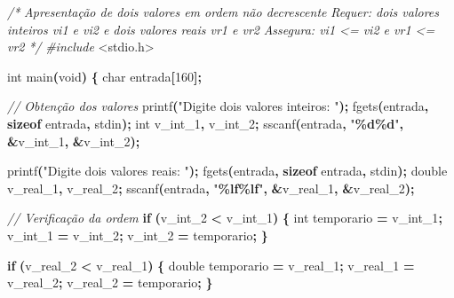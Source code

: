 \documentclass[
  11pt,
  a4paper,
]{scrbook}
\newenvironment{Shaded}{\begin{snugshade}}{\end{snugshade}}
\newcommand{\CommentTok}[1]{\textcolor[rgb]{0.56,0.35,0.01}{\textit{#1}}}
\newcommand{\ControlFlowTok}[1]{\textcolor[rgb]{0.13,0.29,0.53}{\textbf{#1}}}
\newcommand{\DataTypeTok}[1]{\textcolor[rgb]{0.13,0.29,0.53}{#1}}
\newcommand{\DecValTok}[1]{\textcolor[rgb]{0.00,0.00,0.81}{#1}}
\newcommand{\ImportTok}[1]{#1}
\newcommand{\KeywordTok}[1]{\textcolor[rgb]{0.13,0.29,0.53}{\textbf{#1}}}
\newcommand{\NormalTok}[1]{#1}
\newcommand{\OperatorTok}[1]{\textcolor[rgb]{0.81,0.36,0.00}{\textbf{#1}}}
\newcommand{\PreprocessorTok}[1]{\textcolor[rgb]{0.56,0.35,0.01}{\textit{#1}}}
\newcommand{\SpecialCharTok}[1]{\textcolor[rgb]{0.81,0.36,0.00}{\textbf{#1}}}
\newcommand{\StringTok}[1]{\textcolor[rgb]{0.31,0.60,0.02}{#1}}
\begin{document}
\begin{Shaded}
\begin{Highlighting}[]
\CommentTok{/*}
\CommentTok{Apresentação de dois valores em ordem não decrescente}
\CommentTok{Requer:  dois valores inteiros vi1 e vi2 e dois valores reais vr1 e vr2}
\CommentTok{Assegura: vi1 \textless{}= vi2 e vr1 \textless{}= vr2}
\CommentTok{*/}
\PreprocessorTok{\#include }\ImportTok{\textless{}stdio.h\textgreater{}}

\DataTypeTok{int}\NormalTok{ main}\OperatorTok{(}\DataTypeTok{void}\OperatorTok{)} \OperatorTok{\{}
    \DataTypeTok{char}\NormalTok{ entrada}\OperatorTok{[}\DecValTok{160}\OperatorTok{];}

    \CommentTok{// Obtenção dos valores}
\NormalTok{    printf}\OperatorTok{(}\StringTok{"Digite dois valores inteiros: "}\OperatorTok{);}
\NormalTok{    fgets}\OperatorTok{(}\NormalTok{entrada}\OperatorTok{,} \KeywordTok{sizeof}\NormalTok{ entrada}\OperatorTok{,}\NormalTok{ stdin}\OperatorTok{);}
    \DataTypeTok{int}\NormalTok{ v\_int\_1}\OperatorTok{,}\NormalTok{ v\_int\_2}\OperatorTok{;}
\NormalTok{    sscanf}\OperatorTok{(}\NormalTok{entrada}\OperatorTok{,} \StringTok{"}\SpecialCharTok{\%d\%d}\StringTok{"}\OperatorTok{,} \OperatorTok{\&}\NormalTok{v\_int\_1}\OperatorTok{,} \OperatorTok{\&}\NormalTok{v\_int\_2}\OperatorTok{);}

\NormalTok{    printf}\OperatorTok{(}\StringTok{"Digite dois valores reais: "}\OperatorTok{);}
\NormalTok{    fgets}\OperatorTok{(}\NormalTok{entrada}\OperatorTok{,} \KeywordTok{sizeof}\NormalTok{ entrada}\OperatorTok{,}\NormalTok{ stdin}\OperatorTok{);}
    \DataTypeTok{double}\NormalTok{ v\_real\_1}\OperatorTok{,}\NormalTok{ v\_real\_2}\OperatorTok{;}
\NormalTok{    sscanf}\OperatorTok{(}\NormalTok{entrada}\OperatorTok{,} \StringTok{"}\SpecialCharTok{\%lf\%lf}\StringTok{"}\OperatorTok{,} \OperatorTok{\&}\NormalTok{v\_real\_1}\OperatorTok{,} \OperatorTok{\&}\NormalTok{v\_real\_2}\OperatorTok{);}

    \CommentTok{// Verificação da ordem}
    \ControlFlowTok{if} \OperatorTok{(}\NormalTok{v\_int\_2 }\OperatorTok{\textless{}}\NormalTok{ v\_int\_1}\OperatorTok{)} \OperatorTok{\{}
        \DataTypeTok{int}\NormalTok{ temporario }\OperatorTok{=}\NormalTok{ v\_int\_1}\OperatorTok{;}
\NormalTok{        v\_int\_1 }\OperatorTok{=}\NormalTok{ v\_int\_2}\OperatorTok{;}
\NormalTok{        v\_int\_2 }\OperatorTok{=}\NormalTok{ temporario}\OperatorTok{;}
    \OperatorTok{\}}

    \ControlFlowTok{if} \OperatorTok{(}\NormalTok{v\_real\_2 }\OperatorTok{\textless{}}\NormalTok{ v\_real\_1}\OperatorTok{)} \OperatorTok{\{}
        \DataTypeTok{double}\NormalTok{ temporario }\OperatorTok{=}\NormalTok{ v\_real\_1}\OperatorTok{;}
\NormalTok{        v\_real\_1 }\OperatorTok{=}\NormalTok{ v\_real\_2}\OperatorTok{;}
\NormalTok{        v\_real\_2 }\OperatorTok{=}\NormalTok{ temporario}\OperatorTok{;}
    \OperatorTok{\}}


\end{Highlighting}
\end{Shaded}
\end{document}
